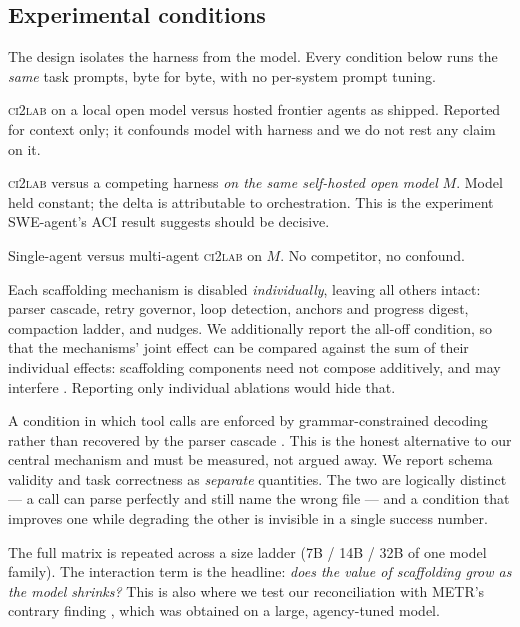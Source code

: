 \documentclass[11pt,a4paper]{article}
\begin{document}
\subsection{Experimental conditions}
\label{sec:conditions}

The design isolates the harness from the model. Every condition below runs the
\emph{same} task prompts, byte for byte, with no per-system prompt tuning.

\begin{description}\itemsep2pt
  \item[H1 --- System comparison (context).] \textsc{ci2lab} on a local open
    model versus hosted frontier agents as shipped. Reported for context only;
    it confounds model with harness and we do not rest any claim on it.
  \item[H2 --- Harness isolation (primary).] \textsc{ci2lab} versus a competing
    harness \emph{on the same self-hosted open model} $M$. Model held constant;
    the delta is attributable to orchestration. This is the experiment SWE-agent's
    ACI result \citep{yang2024sweagent} suggests should be decisive.
  \item[H3 --- Internal control.] Single-agent versus multi-agent
    \textsc{ci2lab} on $M$. No competitor, no confound.
  \item[A --- Mechanism ablation (the core contribution).] Each scaffolding
    mechanism is disabled \emph{individually}, leaving all others intact:
    parser cascade, retry governor, loop detection, anchors and progress digest,
    compaction ladder, and nudges. We additionally report the all-off condition,
    so that the mechanisms' joint effect can be compared against the sum of their
    individual effects: scaffolding components need not compose additively, and
    may interfere \citep{liu2026moreisnotbetter}. Reporting only individual
    ablations would hide that.
  \item[C --- Constrained-decoding baseline.] A condition in which tool calls
    are enforced by grammar-constrained decoding rather than recovered by the
    parser cascade \citep{willard2023outlines,llamacpp}. This is the honest
    alternative to our central mechanism and must be measured, not argued away.
    We report schema validity and task correctness as \emph{separate} quantities.
    The two are logically distinct --- a call can parse perfectly and still name
    the wrong file --- and a condition that improves one while degrading the other
    is invisible in a single success number.
  \item[L --- Model ladder.] The full matrix is repeated across a size ladder
    (7B / 14B / 32B of one model family). The interaction term is the headline:
    \emph{does the value of scaffolding grow as the model shrinks?} This is also
    where we test our reconciliation with METR's contrary finding
    \citep{metr2024elicitation}, which was obtained on a large, agency-tuned
    model.
\end{description}
\end{document}
